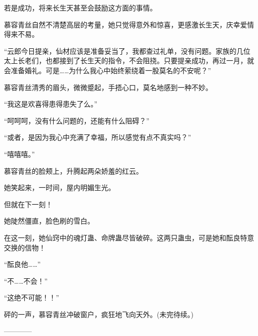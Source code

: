 \begin{this_body}
若是成功，将来长生天甚至会鼓励这方面的事情。

慕容青丝自然不清楚高层的考量，她只觉得意外和惊喜，更感激长生天，庆幸爱情得来不易。

“云郎今日提亲，仙材应该是准备妥当了，我都查过礼单，没有问题。家族的几位太上长老们，也都接到了长生天的指令，不会阻挠。只要提亲成功，再过一月，就会准备婚礼。可是……为什么我心中始终萦绕着一股莫名的不安呢？”

慕容青丝清秀的眉头，微微蹙起，手捂心口，莫名地感到一种不妙。

“我这是欢喜得患得患失了么。”

“呵呵呵，没有什么问题的，还能有什么阻碍？”

“或者，是因为我心中充满了幸福，所以感觉有点不真实吗？”

“嘻嘻嘻。”

慕容青丝的脸颊上，升腾起两朵娇羞的红云。

她笑起来，一时间，屋内明媚生光。

但就在下一刻！

她陡然僵直，脸色刷的雪白。

在这一刻，她仙窍中的魂灯蛊、命牌蛊尽皆破碎。这两只蛊虫，可是她和酝良特意交换的信物！

“酝良他……”

“不……不会！”

“这绝不可能！！”

砰的一声，慕容青丝冲破窗户，疯狂地飞向天外。(未完待续。)

------------

\end{this_body}

